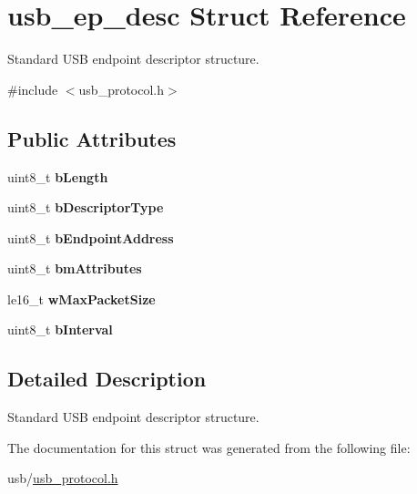 \hypertarget{structusb__ep__desc}{}\section{usb\+\_\+ep\+\_\+desc Struct Reference}
\label{structusb__ep__desc}


Standard U\+SB endpoint descriptor structure.  




{\ttfamily \#include $<$usb\+\_\+protocol.\+h$>$}

\subsection*{Public Attributes}
\begin{DoxyCompactItemize}
\item 
\mbox{\label{structusb__ep__desc_a17e7b790ca26100d8c01e605ab5545cb}} 
uint8\+\_\+t {\bfseries b\+Length}
\item 
\mbox{\label{structusb__ep__desc_ae138f5717a65fe82b3aa47ce249fc439}} 
uint8\+\_\+t {\bfseries b\+Descriptor\+Type}
\item 
\mbox{\label{structusb__ep__desc_addbdba05e93f60612dc59c9fc966f0da}} 
uint8\+\_\+t {\bfseries b\+Endpoint\+Address}
\item 
\mbox{\label{structusb__ep__desc_a87d9ee6aa62404b2d22d170d11d06136}} 
uint8\+\_\+t {\bfseries bm\+Attributes}
\item 
\mbox{\label{structusb__ep__desc_a9b71277a71adae3af5be3e0c5bbb5b5c}} 
le16\+\_\+t {\bfseries w\+Max\+Packet\+Size}
\item 
\mbox{\label{structusb__ep__desc_a42f13e69cdac5ef17b05a6926c155e65}} 
uint8\+\_\+t {\bfseries b\+Interval}
\end{DoxyCompactItemize}


\subsection{Detailed Description}
Standard U\+SB endpoint descriptor structure. 

The documentation for this struct was generated from the following file\+:\begin{DoxyCompactItemize}
\item 
usb/\hyperlink{usb__protocol_8h}{usb\+\_\+protocol.\+h}\end{DoxyCompactItemize}
